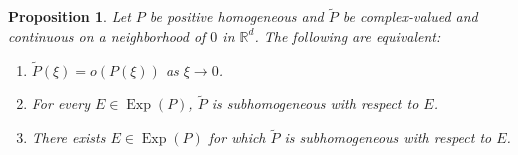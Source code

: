 \documentclass[11pt]{article}
\newtheorem{proposition}[theorem]{Proposition}
\theoremstyle{remark}
\newcommand\Exp{\operatorname{Exp}}
\begin{document}
\begin{proposition}\label{prop:Subhomequivtolittleoh}
Let $P$ be positive homogeneous and $\widetilde{P}$ be complex-valued and continuous on a neighborhood of $0$ in $\mathbb{R}^d$. The following are equivalent:
\begin{enumerate}[label=(\alph*), ref=(\alph*)]
    \item\label{item:Subhomequivtolittleoh1} $\widetilde{P}(\xi)=o(P(\xi))$ as $\xi\to 0$.
    \item\label{item:Subhomequivtolittleoh2} For every $E\in\Exp(P)$, $\widetilde{P}$ is subhomogeneous with respect to $E$.
    \item\label{item:Subhomequivtolittleoh3} There exists $E\in\Exp(P)$ for which $\widetilde{P}$ is subhomogeneous with respect to $E$.
\end{enumerate}
\end{proposition}
\end{document}
